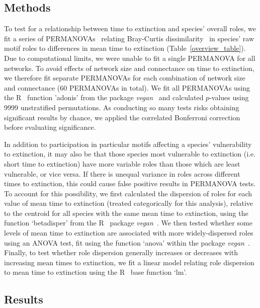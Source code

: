 \documentclass[12pt]{article}
\begin{document}
	\subsection*{Methods}


		To test for a relationship between time to extinction and species' overall roles, we fit a series of PERMANOVAs~\citep{Anderson2001} relating Bray-Curtis dissimilarity~\citep{Baker2015,Cirtwill2015} in species' raw motif roles to differences in mean time to extinction (Table~\ref{overview_table}).
		Due to computational limits, we were unable to fit a single PERMANOVA for all networks.
		To avoid effects of network size and connectance on time to extinction, we therefore fit separate PERMANOVAs for each combination of network size and connectance (60 PERMANOVAs in total).
		We fit all PERMANOVAs using the R~\citep{R} function 'adonis' from the package \emph{vegan}~\citep{vegan} and calculated $p$-values using 9999 unstratified permutations.
		As conducting so many tests risks obtaining significant results by chance, we applied the correlated Bonferroni correction~\citep{Drezner2016} before evaluating significance.
		
        
        In addition to participation in particular motifs affecting a species' vulnerability to extinction, it may also be that those species most vulnerable to extinction (i.e. short time to extinction) have more variable roles than those which are least vulnerable, or vice versa. 
        If there is unequal variance in roles across different times to extinction, this could cause false positive results in PERMANOVA tests.
        To account for this possibility, we first calculated the dispersion of roles for each value of mean time to extinction (treated categorically for this analysis), relative to the centroid for all species with the same mean time to extinction, using the function `betadisper' from the R~\citep{R} package \emph{vegan}~\citep{vegan}.
        We then tested whether some levels of mean time to extinction are associated with more widely-dispersed roles using an ANOVA test, fit using the function `anova' within the package \emph{vegan}~\citep{vegan}.
        Finally, to test whether role dispersion generally increases or decreases with increasing mean times to extinction, we fit a linear model relating role dispersion to mean time to extinction using the R~\citep{R} base function `lm'.


	\subsection*{Results}
\end{document}
